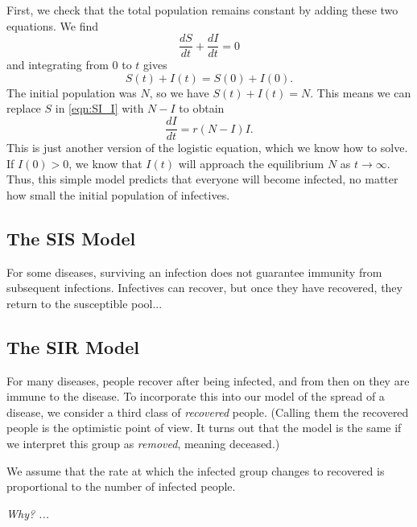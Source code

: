 \documentclass{book}
\begin{document}
First, we check that the total population remains constant by adding these
two equations.  We find
\begin{equation}
  \frac{dS}{dt} + \frac{dI}{dt} = 0
\end{equation}
and integrating from $0$ to $t$ gives
\begin{equation}
  S(t) + I(t) = S(0)+I(0).
\end{equation}
The initial population was $N$, so we have
$S(t)+I(t)=N$.
This means we can replace $S$ in \eqref{eqn:SI_I} with
$N-I$ to obtain
\begin{equation}
  \frac{dI}{dt} = r(N-I)I.
\end{equation}
This is just another version of the logistic equation, 
which we know how to solve.
If $I(0)>0$, we know that $I(t)$ will approach the
equilibrium $N$ as $t\rightarrow\infty$.
Thus, this simple model predicts that
everyone will become infected, no matter how small
the initial population of infectives.

\subsection{The SIS Model}
%
%
For some diseases, surviving an infection
does not guarantee immunity from subsequent infections.
Infectives can recover,
but once they have recovered, they return to the
susceptible pool... 


\subsection{The SIR Model}
For many diseases, people recover after being infected,
and from then on they are immune to the disease.
To incorporate this into our model of the spread of
a disease, we consider a third class of \emph{recovered}
people. (Calling them the recovered people is the
optimistic point of view.  It turns out that the
model is the same if we interpret this group as
\emph{removed}, meaning deceased.)

We assume that the rate at which the infected
group changes to recovered is proportional to
the number of infected people.

\emph{Why? ...}
\end{document}
